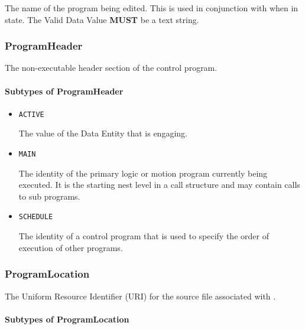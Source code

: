 The name of the program being edited. 
 This is used in conjunction with  when in  state. 
 The \gls{Valid Data Value} \textbf{MUST} be a text string.


\subsubsection{ProgramHeader}
\label{sec:ProgramHeader}



The non-executable header section of the control program.


\paragraph{Subtypes of ProgramHeader}\mbox{}
\label{sec:Subtypes of ProgramHeader}

\begin{itemize}

\item \texttt{ACTIVE}


The value of the \gls{Data Entity} that is engaging.

\item \texttt{MAIN}


The identity of the primary logic or motion program currently being executed. It is the starting nest level in a call structure and may contain calls to sub programs.

\item \texttt{SCHEDULE}


The identity of a control program that is used to specify the order of execution of other programs.


\end{itemize}

\subsubsection{ProgramLocation}
\label{sec:ProgramLocation}



The Uniform Resource Identifier (URI) for the source file associated with .


\paragraph{Subtypes of ProgramLocation}\mbox{}
\label{sec:Subtypes of ProgramLocation}

